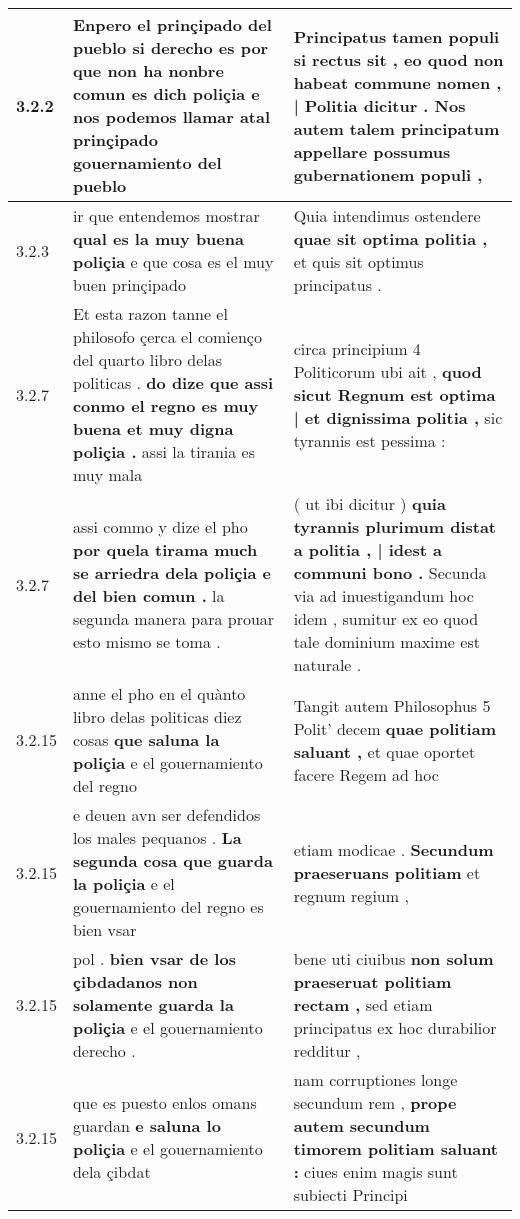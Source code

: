 \begin{tabular}{|p{1cm}|p{6.5cm}|p{6.5cm}|}
3.2.2 & Enpero el prinçipado del pueblo si derecho es \textbf{ por que non ha nonbre comun es dich poliçia } e nos podemos llamar atal prinçipado gouernamiento del pueblo & Principatus tamen populi si rectus sit , \textbf{ eo quod non habeat commune nomen , | Politia dicitur . } Nos autem talem principatum appellare possumus gubernationem populi , \\\hline
3.2.3 & ir que entendemos mostrar \textbf{ qual es la muy buena poliçia } e que cosa es el muy buen prinçipado & Quia intendimus ostendere \textbf{ quae sit optima politia , } et quis sit optimus principatus . \\\hline
3.2.7 & Et esta razon tanne el philosofo çerca el comienço del quarto libro delas politicas . \textbf{ do dize que assi conmo el regno es muy buena et muy digna poliçia . } assi la tirania es muy mala & circa principium 4 Politicorum ubi ait , \textbf{ quod sicut Regnum est optima | et dignissima politia , } sic tyrannis est pessima : \\\hline
3.2.7 & assi commo y dize el pho \textbf{ por quela tirama much se arriedra dela poliçia e del bien comun . } la segunda manera para prouar esto mismo se toma . & ( ut ibi dicitur ) \textbf{ quia tyrannis plurimum distat a politia , | idest a communi bono . } Secunda via ad inuestigandum hoc idem , sumitur ex eo quod tale dominium maxime est naturale . \\\hline
3.2.15 & anne el pho en el quànto libro delas politicas diez cosas \textbf{ que saluna la poliçia } e el gouernamiento del regno & Tangit autem Philosophus 5 Polit’ decem \textbf{ quae politiam saluant , } et quae oportet facere Regem ad hoc \\\hline
3.2.15 & e deuen avn ser defendidos los males pequanos . \textbf{ La segunda cosa que guarda la poliçia } e el gouernamiento del regno es bien vsar & etiam modicae . \textbf{ Secundum praeseruans politiam } et regnum regium , \\\hline
3.2.15 & pol . \textbf{ bien vsar de los çibdadanos non solamente guarda la poliçia } e el gouernamiento derecho . & bene uti ciuibus \textbf{ non solum praeseruat politiam rectam , } sed etiam principatus ex hoc durabilior redditur , \\\hline
3.2.15 & que es puesto enlos omans guardan \textbf{ e saluna lo poliçia } e el gouernamiento dela çibdat & nam corruptiones longe secundum rem , \textbf{ prope autem secundum timorem politiam saluant : } ciues enim magis sunt subiecti Principi \\\hline

\end{tabular}
